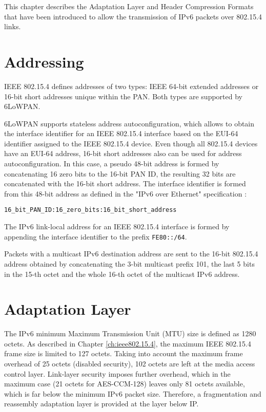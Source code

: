 \documentclass[12pt, titlepage, a4paper]{report}
\begin{document}
This chapter describes the Adaptation Layer and Header Compression Formats that have been introduced to allow the transmission of IPv6 packets over 802.15.4 links.

\section{Addressing}
IEEE 802.15.4 defines addresses of two types: IEEE 64-bit extended addresses or 16-bit short addresses unique within the PAN. Both types are supported by 6LoWPAN.

6LoWPAN supports stateless address autoconfiguration, which allows to obtain the interface identifier \cite{rfc4291} for an IEEE 802.15.4 interface  based on the EUI-64 identifier \cite{eui64} \cite{rfc2464} assigned to the IEEE 802.15.4 device. Even though all 802.15.4 devices have an EUI-64 address, 16-bit short addresses also can be used for address autoconfiguration.  In this case, a pseudo 48-bit address is formed by concatenating 16 zero bits to the 16-bit PAN ID, the resulting 32 bits are concatenated with the 16-bit short address. The interface identifier is formed from this 48-bit address as defined in the "IPv6 over Ethernet" specification \cite{rfc2464}:
\begin{center}\texttt{16\_bit\_PAN\_ID:16\_zero\_bits:16\_bit\_short\_address}\end{center}

The IPv6 link-local address for an IEEE 802.15.4 interface is formed by appending the interface identifier to the prefix \texttt{FE80::/64}.

Packets with a multicast IPv6 destination address are sent to the 16-bit 802.15.4 address obtained by concatenating the 3-bit multicast prefix 101, the last 5 bits in the 15-th octet and the whole 16-th octet of the multicast IPv6 address.

\section{Adaptation Layer}\label{sec:adapt.layer}
The IPv6 minimum Maximum Transmission Unit (MTU) size is defined as 1280 octets. As described in Chapter \ref{ch:ieee802.15.4}, the maximum IEEE 802.15.4 frame size is limited to 127 octets.  Taking into account the maximum frame overhead of 25 octets (disabled security), 102 octets are left at the media access control layer. Link-layer security imposes further overhead, which in the maximum case (21 octets for AES-CCM-128) leaves only 81 octets available, which is far below the minimum IPv6 packet size. Therefore, a fragmentation and reassembly adaptation layer is provided at the layer below IP.
\end{document}
